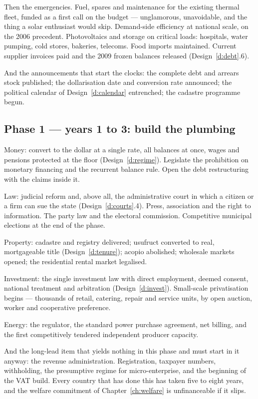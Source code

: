 Then the emergencies. Fuel, spares and maintenance for the existing thermal
fleet, funded as a first call on the budget --- unglamorous, unavoidable, and the
thing a solar enthusiast would skip. Demand-side efficiency at national scale, on
the 2006 precedent. Photovoltaics and storage on critical loads: hospitals, water
pumping, cold stores, bakeries, telecoms. Food imports maintained. Current
supplier invoices paid and the 2009 frozen balances released
(Design~\ref{d:debt}.6).

And the announcements that start the clocks: the complete debt and arrears stock
published; the dollarisation date and conversion rate announced; the political
calendar of Design~\ref{d:calendar} entrenched; the cadastre programme begun.

\subsection*{Phase 1 --- years 1 to 3: build the plumbing}

Money: convert to the dollar at a single rate, all balances at once, wages and
pensions protected at the floor (Design~\ref{d:regime}). Legislate the
prohibition on monetary financing and the recurrent balance rule. Open the debt
restructuring with the claims inside it.

Law: judicial reform and, above all, the administrative court in which a citizen
or a firm can sue the state (Design~\ref{d:courts}.4). Press, association and the
right to information. The party law and the electoral commission. Competitive
municipal elections at the end of the phase.

Property: cadastre and registry delivered; usufruct converted to real,
mortgageable title (Design~\ref{d:tenure}); acopio abolished; wholesale markets
opened; the residential rental market legalised.

Investment: the single investment law with direct employment, deemed consent,
national treatment and arbitration (Design~\ref{d:invest}). Small-scale
privatisation begins --- thousands of retail, catering, repair and service units,
by open auction, worker and cooperative preference.

Energy: the regulator, the standard power purchase agreement, net billing, and
the first competitively tendered independent producer capacity.

And the long-lead item that yields nothing in this phase and must start in it
anyway: the revenue administration. Registration, taxpayer numbers, withholding,
the presumptive regime for micro-enterprise, and the beginning of the VAT build.
Every country that has done this has taken five to eight years, and the welfare
commitment of Chapter~\ref{ch:welfare} is unfinanceable if it slips.

